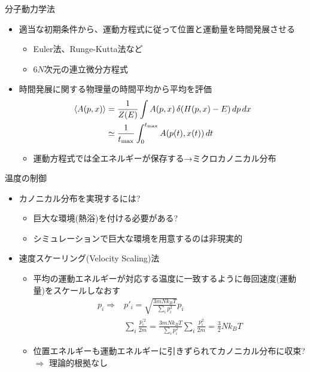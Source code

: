 \begin{frame}[t,fragile]{分子動力学法}
  \begin{itemize}
    \setlength{\itemsep}{1em}
  \item 適当な初期条件から、運動方程式に従って位置と運動量を時間発展させる
    \begin{itemize}
    \item Euler法、Runge-Kutta法など
    \item $6N$次元の連立微分方程式
    \end{itemize}
  \item 時間発展に関する物理量の時間平均から平均を評価
    \begin{align*}
      \langle A(p,x) \rangle &= \frac{1}{Z(E)} \int A(p,x) \, \delta(H(p,x)-E) \, dp \, dx \\
      &\simeq \frac{1}{t_{\rm max}} \int_0^{t_{\rm max}} A(p(t),x(t)) \, dt
    \end{align*}
    \begin{itemize}
    \item 運動方程式では全エネルギーが保存する→ミクロカノニカル分布
    \end{itemize}
  \end{itemize}
\end{frame}


%

%


\begin{frame}[t,fragile]{温度の制御}
  \begin{itemize}
  \item カノニカル分布を実現するには?
    \begin{itemize}
    \item 巨大な環境(熱浴)を付ける必要がある?
    \item シミュレーションで巨大な環境を用意するのは非現実的
    \end{itemize}
  \item 速度スケーリング(Velocity Scaling)法
    \begin{itemize}
    \item 平均の運動エネルギーが対応する温度に一致するように毎回速度(運動量)をスケールしなおす
      \begin{align*}
        p_i \Rightarrow &p'_i = \sqrt{ \frac{3mNk_BT}{\sum_i p_i^2} } p_i \\
        & \sum_i \frac{p_i^{'2}}{2m} = \frac{3mNk_BT}{\sum_i p_i^2} \sum_i \frac{p_i^2}{2m} = \frac{3}{2} N k_B T
      \end{align*}
    \item 位置エネルギーも運動エネルギーに引きずられてカノニカル分布に収束? $\Rightarrow$ 理論的根拠なし
    \end{itemize}
  \end{itemize}
\end{frame}

